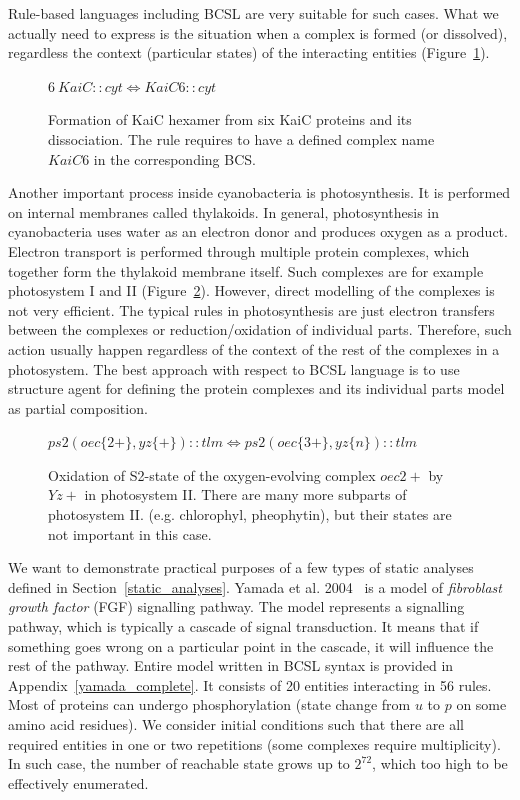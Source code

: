 \documentclass[12pt, twoside]{fithesis2} %
\begin{document}
Rule-based languages including BCSL are very suitable for such cases. What we actually need to express is the situation when a complex is formed (or dissolved), regardless the context (particular states) of the interacting entities (Figure~\ref{hexamer_rule}).

\begin{figure}[!h]
{\small
\begin{center}
$ 6 ~KaiC::cyt \Leftrightarrow KaiC6::cyt $
\end{center}
}
\caption{Formation of KaiC hexamer from six KaiC proteins and its dissociation. The rule requires to have a defined complex name $KaiC6$ in the corresponding BCS.}\label{hexamer_rule}
\end{figure}

Another important process inside cyanobacteria is photosynthesis. It is performed on internal membranes called thylakoids. In general, photosynthesis in cyanobacteria uses water as an electron donor and produces oxygen as a product. Electron transport is performed through multiple protein complexes, which together form the thylakoid membrane itself. Such complexes are for example photosystem I and II (Figure~\ref{ps2_rule}). However, direct modelling of the complexes is not very efficient. The typical rules in photosynthesis are just electron transfers between the complexes or reduction/oxidation of individual parts. Therefore, such action usually happen regardless of the context of the rest of the complexes in a photosystem. The best approach with respect to BCSL language is to use structure agent for defining the protein complexes and its individual parts model as partial composition.

\begin{figure}[!h]
{\small
\begin{center}
$ ps2(oec\{2+\}, yz\{+\})::tlm \Leftrightarrow ps2(oec\{3+\}, yz\{n\})::tlm $
\end{center}
}
\caption{Oxidation of S2-state of the oxygen-evolving complex $oec{2+}$ by $Yz{+}$ in photosystem II. There are many more subparts of photosystem II. (e.g. chlorophyl, pheophytin), but their states are not important in this case.}\label{ps2_rule}
\end{figure}

We want to demonstrate practical purposes of a few types of static analyses defined in Section~\ref{static_analyses}. Yamada et al. 2004~\cite{yamada2004model} is a model of \emph{fibroblast growth factor} (FGF) signalling pathway. The model represents a signalling pathway, which is typically a cascade of signal transduction. It means that if something goes wrong on a particular point in the cascade, it will influence the rest of the pathway. Entire model written in BCSL syntax is provided in Appendix~\ref{yamada_complete}. It consists of 20 entities interacting in 56 rules. Most of proteins can undergo phosphorylation (state change from $u$ to $p$ on some amino acid residues). We consider initial conditions such that there are all required entities in one or two repetitions (some complexes require multiplicity). In such case, the number of reachable state grows up to $2^{72}$, which too high to be effectively enumerated.
\end{document}
